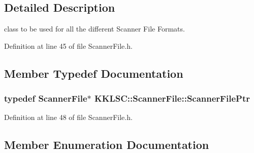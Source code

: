 \subsection{Detailed Description}
class to be used for all the different Scanner File Formats. 

Definition at line 45 of file Scanner\+File.\+h.



\subsection{Member Typedef Documentation}
\subsubsection[{\texorpdfstring{Scanner\+File\+Ptr}{ScannerFilePtr}}]{\setlength{\rightskip}{0pt plus 5cm}typedef {\bf Scanner\+File}$\ast$ {\bf K\+K\+L\+S\+C\+::\+Scanner\+File\+::\+Scanner\+File\+Ptr}}\hypertarget{class_k_k_l_s_c_1_1_scanner_file_a4ce197a15dc3da96b2258d55f383db2d}{}\label{class_k_k_l_s_c_1_1_scanner_file_a4ce197a15dc3da96b2258d55f383db2d}


Definition at line 48 of file Scanner\+File.\+h.



\subsection{Member Enumeration Documentation}
